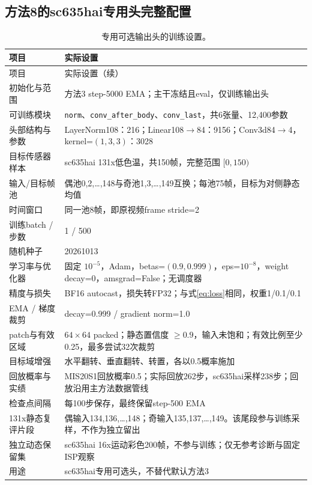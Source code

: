 \subsection{方法8的sc635hai专用头完整配置}

\begin{longtable}{p{}p{}}
\caption{专用可选输出头的训练设置。}\label{tab:head_config}\\
\toprule 项目 & 实际设置 \\ \midrule
\endfirsthead
\toprule 项目 & 实际设置（续） \\ \midrule
\endhead
\bottomrule\endfoot
初始化与范围 & 方法3 step-5000 EMA；主干冻结且eval，仅训练输出头 \\
可训练模块 & \texttt{norm}、\texttt{conv\_after\_body}、\texttt{conv\_last}，共6张量、12,400参数 \\
头部结构与参数 & LayerNorm108：216；Linear108$\to$84：9156；Conv3d84$\to$4，kernel=$(1,3,3)$：3028 \\
目标传感器样本 & sc635hai 131x低色温，共150帧，完整范围 $[0,150)$ \\
输入/目标帧池 & 偶池0,2,\ldots,148与奇池1,3,\ldots,149互换；每池75帧，目标为对侧静态均值 \\
时间窗口 & 同一池8帧，即原视频frame stride=2 \\
训练batch / 步数 & 1 / 500 \\
随机种子 & 20261013 \\
学习率与优化器 & 固定 $10^{-5}$，Adam，betas=$(0.9,0.999)$，eps=$10^{-8}$，weight decay=0，amsgrad=False；无调度器 \\
精度与损失 & BF16 autocast，损失转FP32；与式\eqref{eq:loss}相同，权重1/0.1/0.1 \\
EMA / 梯度裁剪 & decay=0.999 / gradient norm=1.0 \\
patch与有效区域 & $64\times64$ packed；静态置信度 $\ge0.9$，输入未饱和；有效比例至少0.25，最多尝试32次裁剪 \\
目标域增强 & 水平翻转、垂直翻转、转置，各以0.5概率施加 \\
回放概率与实绩 & MIS20S1回放概率0.5；实际回放262步，sc635hai采样238步；回放沿用主方法数据管线 \\
检查点间隔 & 每100步保存，最终保留step-500 EMA \\
131x静态复评片段 & 偶输入134,136,\ldots,148；奇输入135,137,\ldots,149。该尾段参与训练采样，不作为独立留出 \\
独立动态保留集 & sc635hai 16x运动彩色200帧，不参与训练；仅无参考诊断与固定ISP观察 \\
用途 & sc635hai专用可选头，不替代默认方法3 \\
\end{longtable}

